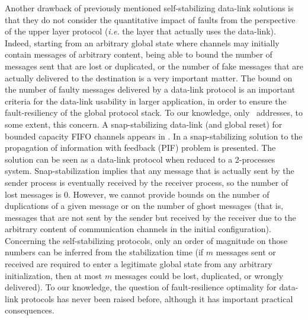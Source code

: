 \documentclass[11pt]{article}
\begin{document}
Another drawback of previously mentioned self-stabilizing data-link solutions is that they do not consider the quantitative impact of faults from the perspective of the upper layer protocol (\emph{i.e.} the layer that actually uses the data-link). Indeed, starting from an arbitrary global state where channels may initially contain messages 
of arbitrary content, being able to bound the number of messages sent that are lost or duplicated, or the number of fake messages that are actually delivered to the destination is a very important matter. The bound on the number of faulty messages delivered by a data-link protocol is an important criteria for the data-link usability in larger application, in order to ensure the fault-resiliency of the global protocol stack. To our knowledge, only~\cite{DT06c,DDNT10j} addresses, to some extent, this concern. A snap-stabilizing data-link (and global reset) for bounded capacity FIFO channels appears in \cite{DT06c}. In \cite{DDNT10j} a snap-stabilizing solution to the propagation of information with feedback (PIF) problem is presented. The solution can be seen as a data-link protocol when reduced to a 2-processes system. Snap-stabilization implies that any message that is actually sent by the sender process is eventually received by the receiver process, so the number of lost messages is $0$. However, we cannot provide bounds on the number of duplications of a given message or on the number of ghost messages (that is, messages that are not sent by the sender  but received by the receiver due to the arbitrary content of communication channels in the initial configuration). Concerning the self-stabilizing protocols, only an order of magnitude on those numbers can be inferred from the stabilization time (if $m$ messages sent or received are required to enter a legitimate global state from any arbitrary initialization, then at most $m$ messages could be lost, duplicated, or wrongly delivered). To our knowledge, the question of fault-resilience optimality for data-link protocols has never been raised before, although it has important practical consequences. 
\end{document}
